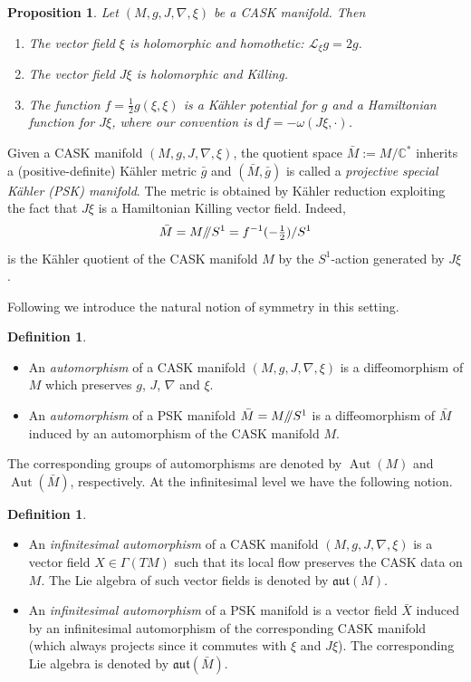 \documentclass{article}
\newtheorem{proposition}[theorem]{Proposition}
\theoremstyle{definition}
\newtheorem{definition}[theorem]{Definition}
\DeclareMathOperator{\Aut}{Aut}
\newcommand{\C}{\mathbb{C}}
\newcommand{\aut}{\mathfrak{aut}}
\renewcommand{\sslash}{/\mkern-5mu/}
\renewcommand{\d}{\mathrm{d}}
\begin{document}
	\begin{proposition}\label{prop:basis_CASK}
		Let $(M,g,J,\nabla,\xi)$ be a CASK manifold. Then \begin{enumerate}[\normalfont(a)]
			\itemsep 0em
			\item The vector field $\xi$ is holomorphic and homothetic: $\mathcal L_\xi g = 2g$.
			\item The vector field $J\xi$ is holomorphic and Killing.
			\item The function $f=\frac{1}{2}g(\xi,\xi)$ is a K\"ahler potential for $g$ and a Hamiltonian function for $J\xi$, where our convention is $\d f=-\omega(J\xi,\cdot)$.
		\end{enumerate}
	\end{proposition}
 
    Given a CASK manifold $(M,g,J,\nabla,\xi)$, the quotient space $\bar{M}:=M/\C^*$ inherits a (positive-definite) K\"ahler metric $\bar{g}$ and $(\bar{M},\bar{g})$ is called a \emph{projective special K\"ahler (PSK) manifold}. The metric is obtained by K\"ahler reduction exploiting the fact that $J\xi$ is a Hamiltonian Killing vector field. Indeed, $$\bar{M}=M\sslash S^1=f^{-1}(-\tfrac{1}{2})/S^1$$ is the K\"ahler quotient of the CASK manifold $M$ by the $S^1$-action generated by $J\xi$.\medskip
    
    Following \cite{CST21} we introduce the natural notion of symmetry in this setting.
	
	\begin{definition}\textcolor{white}{}
		\begin{itemize}
			\itemsep 0em
			\item An \emph{automorphism} of a CASK manifold $(M,g,J,\nabla,\xi)$ is a diffeomorphism of $M$ which preserves $g$, $J$, $\nabla$ and $\xi$.
			\item An \emph{automorphism} of a PSK manifold $\bar{M}=M\sslash S^1$ is a diffeomorphism of $\bar{M}$ induced by an automorphism of the CASK manifold $M$.
		\end{itemize}
	\end{definition}

	The corresponding groups of automorphisms are denoted by $\Aut(M)$ and $\Aut(\bar M)$, respectively. At the infinitesimal level we have the following notion.
	
	\begin{definition}\textcolor{white}{}
		\begin{itemize}
			\itemsep 0em
			\item An \emph{infinitesimal automorphism} of a CASK manifold $(M,g,J,\nabla,\xi)$ is a vector field $X\in\Gamma(TM)$ such that its local flow preserves the CASK data on $M$. The Lie algebra of such vector fields is denoted by $\aut(M)$.
			\item An \emph{infinitesimal automorphism} of a PSK manifold is a vector field $\bar{X}$ induced by an infinitesimal automorphism of the corresponding CASK manifold (which always projects since it commutes with $\xi$ and $J\xi$). The corresponding Lie algebra is denoted by $\aut(\bar{M})$.
		\end{itemize}
	\end{definition}
\end{document}
